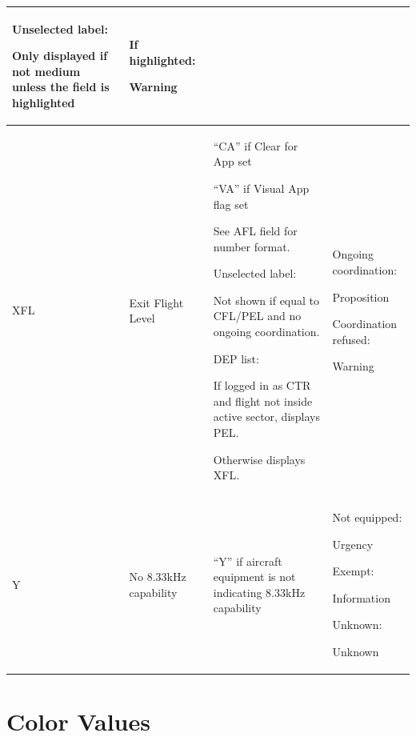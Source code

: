\documentclass[11pt,a4paper]{memoir}
\begin{document}
\begin{longtable}{|p{2.5cm}|p{2.5cm}|p{4.5cm}|p{4.5cm}|}
      Unselected label: 
      
      Only displayed if not medium unless the field is highlighted &
      If highlighted: 
      
      Warning \\ \hline
    XFL &
      Exit Flight Level &
      “CA” if Clear for App set
      
      “VA” if Visual App flag set
      
      See AFL field for number format. 
      \bigskip
      
      Unselected label: 
      
      Not shown if equal to CFL/PEL and  no ongoing coordination. 
      \bigskip
      
      DEP list: 
      
      If logged in as CTR and flight not  inside active sector, displays PEL.  
      
      Otherwise displays XFL. &
      Ongoing coordination:  
      
      Proposition 
      \bigskip
      
      Coordination refused: 
      
      Warning \\ \hline
    Y &
      No 8.33kHz capability &
      “Y” if aircraft equipment is not  indicating 8.33kHz capability &
      Not equipped: 
      
      Urgency 
      \bigskip
      
      Exempt: 
      
      Information 
      \bigskip
      
      Unknown: 
      
      Unknown \\ \hline
    \end{longtable}

\chapter{Color Values}
\end{document}
